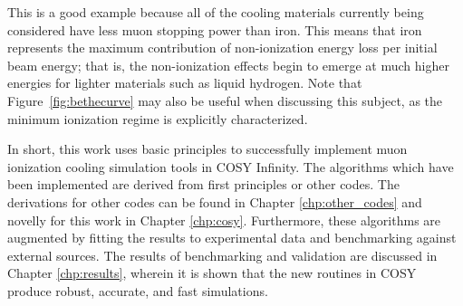 This is a good example because all of the cooling materials currently being considered have less muon stopping power than iron. This means that iron represents the maximum contribution of non-ionization energy loss per initial beam energy; that is, the non-ionization effects begin to emerge at much higher energies for lighter materials such as liquid hydrogen. Note that Figure~\ref{fig:bethecurve} may also be useful when discussing this subject, as the minimum ionization regime is explicitly characterized.


In short, this work uses basic principles to successfully implement muon ionization cooling simulation tools in COSY Infinity. The algorithms which have been implemented are derived from first principles or other codes. The derivations for other codes can be found in Chapter \ref{chp:other_codes} and novelly for this work in Chapter \ref{chp:cosy}. Furthermore, these algorithms are augmented by fitting the results to experimental data and benchmarking against external sources. The results of benchmarking and validation are discussed in Chapter \ref{chp:results}, wherein it is shown that the new routines in COSY produce robust, accurate, and fast simulations.